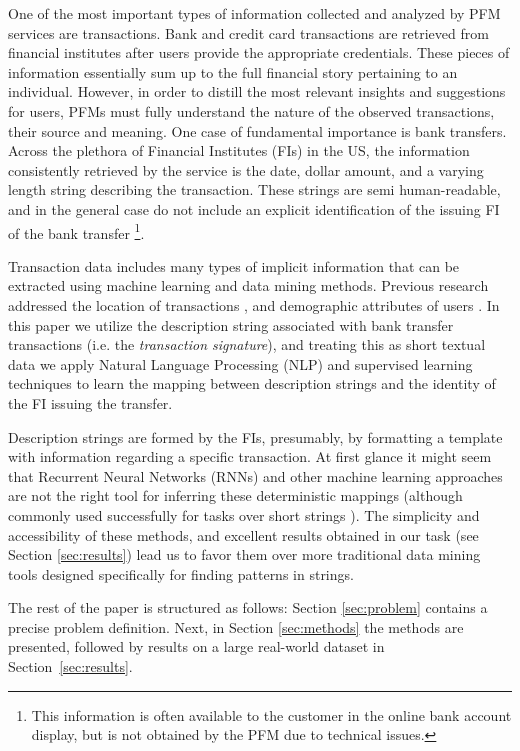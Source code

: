 \documentclass[sigconf]{acmart}
\begin{document}
One of the most important types of information collected and analyzed by PFM services are transactions. Bank and credit card transactions are retrieved from financial institutes after users provide the appropriate credentials. These pieces of information essentially sum up to the full financial story pertaining to an individual. However, in order to distill the most relevant insights and suggestions for users, PFMs must fully understand the nature of the observed transactions, their source and meaning. One case of fundamental importance is bank transfers. Across the plethora of Financial Institutes (FIs) in the US, the information consistently retrieved by the service is the date, dollar amount, and a varying length string describing the transaction. These strings are semi human-readable, and in the general case do not include an explicit identification of the issuing FI of the bank transfer \footnote{This information is often available to the customer in the online bank account display, but is not obtained by the PFM due to technical issues.}.

Transaction data includes many types of implicit information that can be extracted using machine learning and data mining methods. Previous research addressed the location of transactions \cite{intuit-pkdd}, and demographic attributes of users \citep{intuit-wsdm}. In this paper we utilize the description string associated with bank transfer transactions (i.e. the \textit{transaction signature}), and treating this as short textual data we apply Natural Language Processing (NLP) and supervised learning techniques to learn the mapping between description strings and the identity of the FI issuing the transfer. 


Description strings are formed by the FIs, presumably, by formatting a template with information regarding a specific transaction. At first glance it might seem that Recurrent Neural Networks (RNNs) and other machine learning approaches are not the right tool for inferring these deterministic mappings (although commonly used successfully for tasks over short strings \cite{limsopatham2016bidirectional,korpusik2016recurrent,yen2018detecting}). The simplicity and accessibility of these methods, and excellent results obtained in our task (see Section \ref{sec:results}) lead us to favor them over more traditional data mining tools designed specifically for finding patterns in strings. 

The rest of the paper is structured as follows: Section \ref{sec:problem} contains a precise problem definition. Next, in Section \ref{sec:methods} the methods are presented, followed by results on a large real-world dataset in Section~\ref{sec:results}.
\end{document}
